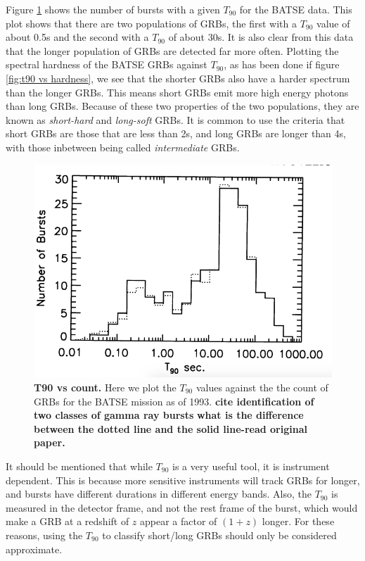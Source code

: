 \documentclass[11pt]{cuthesis}
\begin{document}
Figure \ref{fig:t90 vs count} shows the number of bursts with a given $T_{90}$ for the BATSE data. This plot shows that there are two populations of GRBs, the first with a $T_{90}$ value of about 0.5s and the second with a $T_{90}$ of about 30s. It is also clear from this data that the longer population of GRBs are detected far more often. Plotting the spectral hardness of the BATSE GRBs against $T_{90}$, as has been done if figure \ref{fig:t90 vs hardness}, we see that the shorter GRBs also have a harder spectrum than the longer GRBs. This means short GRBs emit more high energy photons than long GRBs. Because of these two properties of the two populations, they are known as \textit{short-hard} and \textit{long-soft} GRBs. It is common to use the criteria that short GRBs are those that are less than 2s, and long GRBs are longer than 4s, with those inbetween being called \textit{intermediate} GRBs.

\begin{figure} %
\begin{center}
\includegraphics[width=0.8\linewidth]{t90_vs_count.png}
\end{center}
\caption{\textbf{T90 vs count.} Here we plot the $T_{90}$ values against the the count of GRBs for the BATSE mission as of 1993. \textbf{cite identification of two classes of gamma ray bursts} \textbf{what is the difference between the dotted line and the solid line-read original paper.}}
\label{fig:t90 vs count}
\end{figure}

It should be mentioned that while $T_{90}$ is a very useful tool, it is instrument dependent. This is because more sensitive instruments will track GRBs for longer, and bursts have different durations in different energy bands. Also, the $T_{90}$ is measured in the detector frame, and not the rest frame of the burst, which would make a GRB at a redshift of $z$ appear a factor of $(1+z)$ longer. For these reasons, using the $T_{90}$ to classify short/long GRBs should only be considered approximate.  
\end{document}
